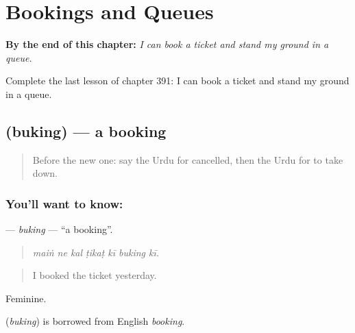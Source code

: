
\chapter{Bookings and Queues}
\label{ch:ur-bookings-and-queues}

\begin{chapteropening}
\textbf{By the end of this chapter:} \emph{I can book a ticket and stand my ground in a queue.}

Complete the last lesson of chapter 391: I can book a ticket and stand my ground in a queue.
\end{chapteropening}

\section[\texorpdfstring{\ur{بکنگ} (buking)}{بکنگ (buking)}]{ (buking) — a booking}

\label{lesson:UR-C391-buking}



\begin{quote}
Before the new one: say the Urdu for cancelled, then the Urdu for to take down.
\end{quote}

\subsection*{You'll want to know: }
\textbf{} — \emph{buking} — \textquotedblleft{}a booking\textquotedblright{}.

\begin{quote}
      
\end{quote}

\begin{quote}
\emph{maiṅ ne kal ṭikaṭ kī buking kī.}
\end{quote}

\begin{quote}
I booked the ticket yesterday.
\end{quote}

Feminine.

\begin{cousinweb}
\textbf{} (\emph{buking}) is borrowed from English \emph{booking}.
\end{cousinweb}

